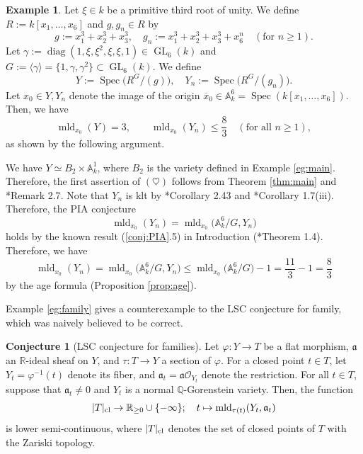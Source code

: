 \documentclass[a4paper,11pt]{amsart}
\theoremstyle{definition}
\newtheorem{eg}[thm]{Example}
\newtheorem{conj}[thm]{Conjecture}
\theoremstyle{remark}
\begin{document}
\begin{eg}\label{eg:adic}
Let $\xi \in k$ be a primitive third root of unity. 
We define $R := k[x_1, \ldots , x_6]$ and $g, g_n \in R$ by 
\[
g := x_1 ^3 + x_2 ^3 + x_3 ^3 , \quad
g_n := x_1 ^3 + x_2 ^3 + x_3 ^3 + x_6^n \quad (\text{for $n \ge 1$}). 
\]
Let 
$\gamma := \operatorname{diag} (1, \xi, \xi^2, \xi, \xi , 1) \in \operatorname{GL}_{6}(k)$ and 
$G := \langle \gamma \rangle = \{ 1, \gamma , \gamma^2 \} \subset \operatorname{GL}_{6}(k)$. 
We define 
\[
Y := \operatorname{Spec} \bigl (R^G/(g) \bigr), \quad
Y_n :=  \operatorname{Spec} \bigl (R^G/(g_n) \bigr). 
\]
Let $x_0 \in Y, Y_n$ denote the image of the origin $\overline{x}_0 \in \mathbb{A}^6 _k = \operatorname{Spec}(k[x_1, \ldots, x_6])$. 
Then, we have 
\[
\operatorname{mld}_{x_0}(Y) = 3 , \qquad
\operatorname{mld}_{x_0}(Y_n) \le \frac{8}{3} \quad (\text{for all $n \ge 1$}), 
\tag{$\heartsuit$}
\]
as shown by the following argument. 

We have $Y \simeq B_2 \times \mathbb{A}_k ^1$, where $B_2$ is the variety defined in Example \ref{eg:main}. 
Therefore, the first assertion of $(\heartsuit)$ follows from Theorem \ref{thm:main} and \cite{Amb99}*{Remark 2.7}. 
Note that $Y_n$ is klt by \cite{Kol13}*{Corollary 2.43} and \cite{Ish96}*{Corollary 1.7(iii)}. 
Therefore, the PIA conjecture 
\[
\operatorname{mld}_{x_0}(Y_n) 
= \operatorname{mld}_{x_0} \bigl( \mathbb{A}_k ^6/G, Y_n \bigr)
\]
holds by the known result (\ref{conj:PIA}.5) in Introduction (\cite{NS22}*{Theorem 1.4}). 
Therefore, we have 
\[
\operatorname{mld}_{x_0}(Y_n) 
= \operatorname{mld}_{x_0} \bigl( \mathbb{A}_k ^6/G, Y_n \bigr) 
\le \operatorname{mld}_{x_0} \bigl (\mathbb{A}_k ^6/G \bigr) -1 
= \frac{11}{3} - 1 = \frac{8}{3}
\]
by the age formula (Proposition \ref{prop:age}). 
\end{eg}

Example \ref{eg:family} gives a counterexample to the LSC conjecture for family, which was naively believed to be correct.

\begin{conj}[LSC conjecture for families]\label{conj:LSCg}
Let $\varphi: Y \to T$ be a flat morphism, $\mathfrak{a}$ an $\mathbb{R}$-ideal sheaf on $Y$, and 
$\tau: T \to Y$ a section of $\varphi$. 
For a closed point $t \in T$, let $Y_t = \varphi ^{-1} (t)$ denote its fiber, 
and $\mathfrak{a}_t = \mathfrak{a} \mathcal{O}_{Y_t}$ denote the restriction. 
For all $t \in T$, suppose that $\mathfrak{a}_t \not = 0$ and $Y_t$ is a normal $\mathbb{Q}$-Gorenstein variety. 
Then, the function
\[
|T|_{\rm cl} \to \mathbb{R}_{\ge 0} \cup \{ - \infty \}; \quad t \mapsto \operatorname{mld}_{\tau(t)} (Y_t, \mathfrak{a}_t)
\]
is lower semi-continuous, where $|T|_{\rm cl}$ denotes the set of closed points of $T$ with the Zariski topology. 
\end{conj}
\end{document}
